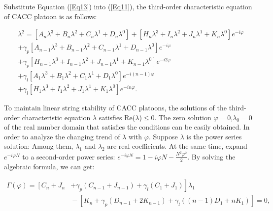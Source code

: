 \documentclass[journal]{IEEEtran}
\begin{document}
Substitute Equation (\ref{Eq13}) into (\ref{Eq11}), the third-order characteristic equation of CACC platoon is as follows:

\begin{equation}
\begin{aligned}
&\lambda^{2}\!=\!\left[A_{n} \lambda^{3}\!+\!B_{n} \lambda^{2}\!+\!C_{n} \lambda^{1}\!+\!D_{n} \lambda^{0}\right]\!+\!\left[H_{n} \lambda^{3}\!+\!I_{n} \lambda^{2}\!+\!J_{n} \lambda^{1}\!+\!K_{n} \lambda^{0}\right] e^{-i \varphi} \\
&+\gamma_{p}\left[A_{n-1} \lambda^{3}+B_{n-1} \lambda^{2}+C_{n-1} \lambda^{1}+D_{n-1} \lambda^{0}\right] e^{-i \varphi} \\
&+\gamma_{p}\left[H_{n-1} \lambda^{3}+I_{n-1} \lambda^{2}+J_{n-1} \lambda^{1}+K_{n-1} \lambda^{0}\right] e^{-i 2 \varphi} \\
&+\gamma_{l}\left[A_{1} \lambda^{3}+B_{1} \lambda^{2}+C_{1} \lambda^{1}+D_{1} \lambda^{0}\right] e^{-i(n-1) \varphi} \\
&+\gamma_{l}\left[H_{1} \lambda^{3}+I_{1} \lambda^{2}+J_{1} \lambda^{1}+K_{1} \lambda^{0}\right] e^{-i n \varphi}.
\end{aligned}
\label{Eq14}
\end{equation}

To maintain linear string stability of CACC platoons, the solutions of the third-order characteristic equation $\lambda$ satisfies Re($\lambda$)$\leq$0. The zero solution $\varphi=0$,$\lambda_0=0$ of the real number domain that satisfies the conditions can be easily obtained. In order to analyze the changing trend of $\lambda$ with $\varphi$. Suppose $\lambda$ is the power series solution: Among them, $\lambda_1$ and $\lambda_2$ are real coefficients. At the same time, expand $e^{-i \varphi N}$ to a second-order power series: $e^{-i \varphi N}=1-i \varphi N-\frac{N^{2} \varphi^{2}}{2}$. By solving the algebraic formula, we can get:

\begin{small}
\begin{equation}
\begin{aligned}
\Gamma(\varphi)=\left[C_{n}+J_{n}\right.&\left.+\gamma_{p}\left(C_{n-1}+J_{n-1}\right)+\gamma_{l}\left(C_{1}+J_{1}\right)\right] \lambda_{1} \\
&\!-\!\left[K_{n}\!+\!\gamma_{p}\left(D_{n-1}\!+\!2 K_{n-1}\right)\!+\!\gamma_{l}\left((n-1) D_{1}\!+\!n K_{1}\right)\right]\!=\!0,
\end{aligned}
\label{Eq15}
\end{equation}
\end{small}
\end{document}
